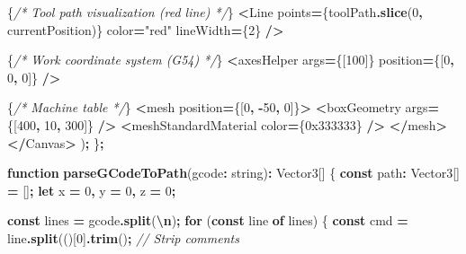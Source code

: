 \documentclass[
]{article}
\newenvironment{Shaded}{\begin{snugshade}}{\end{snugshade}}
\newcommand{\BaseNTok}[1]{\textcolor[rgb]{0.00,0.00,0.81}{#1}}
\newcommand{\CommentTok}[1]{\textcolor[rgb]{0.56,0.35,0.01}{\textit{#1}}}
\newcommand{\ControlFlowTok}[1]{\textcolor[rgb]{0.13,0.29,0.53}{\textbf{#1}}}
\newcommand{\DataTypeTok}[1]{\textcolor[rgb]{0.13,0.29,0.53}{#1}}
\newcommand{\DecValTok}[1]{\textcolor[rgb]{0.00,0.00,0.81}{#1}}
\newcommand{\FunctionTok}[1]{\textcolor[rgb]{0.13,0.29,0.53}{\textbf{#1}}}
\newcommand{\KeywordTok}[1]{\textcolor[rgb]{0.13,0.29,0.53}{\textbf{#1}}}
\newcommand{\NormalTok}[1]{#1}
\newcommand{\OperatorTok}[1]{\textcolor[rgb]{0.81,0.36,0.00}{\textbf{#1}}}
\newcommand{\SpecialCharTok}[1]{\textcolor[rgb]{0.81,0.36,0.00}{\textbf{#1}}}
\newcommand{\StringTok}[1]{\textcolor[rgb]{0.31,0.60,0.02}{#1}}
\begin{document}
\begin{Shaded}
\begin{Highlighting}[]
\NormalTok{      \{}\CommentTok{/* Tool path visualization (red line) */}\NormalTok{\}}
      \OperatorTok{\textless{}}\NormalTok{Line}
\NormalTok{        points}\OperatorTok{=}\NormalTok{\{toolPath}\OperatorTok{.}\FunctionTok{slice}\NormalTok{(}\DecValTok{0}\OperatorTok{,}\NormalTok{ currentPosition)\}}
\NormalTok{        color}\OperatorTok{=}\StringTok{"red"}
\NormalTok{        lineWidth}\OperatorTok{=}\NormalTok{\{}\DecValTok{2}\NormalTok{\}}
      \OperatorTok{/\textgreater{}}

\NormalTok{      \{}\CommentTok{/* Work coordinate system (G54) */}\NormalTok{\}}
      \OperatorTok{\textless{}}\NormalTok{axesHelper args}\OperatorTok{=}\NormalTok{\{[}\DecValTok{100}\NormalTok{]\} position}\OperatorTok{=}\NormalTok{\{[}\DecValTok{0}\OperatorTok{,} \DecValTok{0}\OperatorTok{,} \DecValTok{0}\NormalTok{]\} }\OperatorTok{/\textgreater{}}

\NormalTok{      \{}\CommentTok{/* Machine table */}\NormalTok{\}}
      \OperatorTok{\textless{}}\NormalTok{mesh position}\OperatorTok{=}\NormalTok{\{[}\DecValTok{0}\OperatorTok{,} \OperatorTok{{-}}\DecValTok{50}\OperatorTok{,} \DecValTok{0}\NormalTok{]\}}\OperatorTok{\textgreater{}}
        \OperatorTok{\textless{}}\NormalTok{boxGeometry args}\OperatorTok{=}\NormalTok{\{[}\DecValTok{400}\OperatorTok{,} \DecValTok{10}\OperatorTok{,} \DecValTok{300}\NormalTok{]\} }\OperatorTok{/\textgreater{}}
        \OperatorTok{\textless{}}\NormalTok{meshStandardMaterial color}\OperatorTok{=}\NormalTok{\{}\BaseNTok{0x333333}\NormalTok{\} }\OperatorTok{/\textgreater{}}
      \OperatorTok{\textless{}/}\NormalTok{mesh}\OperatorTok{\textgreater{}}
    \OperatorTok{\textless{}/}\NormalTok{Canvas}\OperatorTok{\textgreater{}}
\NormalTok{  )}\OperatorTok{;}
\NormalTok{\}}\OperatorTok{;}

\KeywordTok{function} \FunctionTok{parseGCodeToPath}\NormalTok{(gcode}\OperatorTok{:} \DataTypeTok{string}\NormalTok{)}\OperatorTok{:}\NormalTok{ Vector3[] \{}
  \KeywordTok{const}\NormalTok{ path}\OperatorTok{:}\NormalTok{ Vector3[] }\OperatorTok{=}\NormalTok{ []}\OperatorTok{;}
  \KeywordTok{let}\NormalTok{ x }\OperatorTok{=} \DecValTok{0}\OperatorTok{,}\NormalTok{ y }\OperatorTok{=} \DecValTok{0}\OperatorTok{,}\NormalTok{ z }\OperatorTok{=} \DecValTok{0}\OperatorTok{;}

  \KeywordTok{const}\NormalTok{ lines }\OperatorTok{=}\NormalTok{ gcode}\OperatorTok{.}\FunctionTok{split}\NormalTok{(}\StringTok{\textquotesingle{}}\SpecialCharTok{\textbackslash{}n}\StringTok{\textquotesingle{}}\NormalTok{)}\OperatorTok{;}
  \ControlFlowTok{for}\NormalTok{ (}\KeywordTok{const}\NormalTok{ line }\KeywordTok{of}\NormalTok{ lines) \{}
    \KeywordTok{const}\NormalTok{ cmd }\OperatorTok{=}\NormalTok{ line}\OperatorTok{.}\FunctionTok{split}\NormalTok{(}\StringTok{\textquotesingle{}(\textquotesingle{}}\NormalTok{)[}\DecValTok{0}\NormalTok{]}\OperatorTok{.}\FunctionTok{trim}\NormalTok{()}\OperatorTok{;}  \CommentTok{// Strip comments}


\end{Highlighting}
\end{Shaded}
\end{document}
